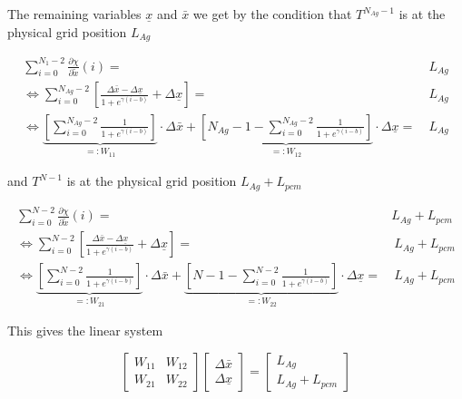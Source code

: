 \documentclass{scrartcl}[12pt, halfparskip]
\numberwithin{equation}{section}
\numberwithin{figure}{section}
\numberwithin{table}{section}
\begin{document}
The remaining variables $\underline{x}$ and $\bar{x}$ we get by the condition that $T^{N_{Ag}-1}$ is at the physical grid position $L_{Ag}$

\begin{subequations}
	\begin{align}
	\sum_{i=0}^{N_1 - 2} \frac{\partial \chi}{\partial \tilde{x}}(i) = \ & L_{Ag} \\
	\Leftrightarrow \sum_{i=0}^{N_{Ag} - 2} \left[ \frac{\Delta \bar{x} - \Delta \underline{x}}{1 + e^{\gamma(i - b)}} + \Delta \underline{x} \right] = \ & L_{Ag} \\
	\Leftrightarrow \underbrace{ \left[ \sum_{i=0}^{N_{Ag} - 2} \frac{1}{1 + e^{\gamma(i - b)}} \right] }_{=: W_{11}} \cdot \Delta \bar{x} + \underbrace{\left[ N_{Ag} - 1 - \sum_{i=0}^{N_{Ag} - 2} \frac{1}{1 + e^{\gamma(i - b)}} \right]}_{=: W_{12}} \cdot \Delta \underline{x} = \ & L_{Ag}
	\end{align}
\end{subequations}

and $T^{N-1}$ is at the physical grid position $L_{Ag}+L_{pcm}$

\begin{subequations}
	\begin{align}
	\sum_{i=0}^{N - 2} \frac{\partial \chi}{\partial \tilde{x}}(i) = \ & L_{Ag}+L_{pcm} \\
	\Leftrightarrow \sum_{i=0}^{N - 2} \left[ \frac{\Delta \bar{x} - \Delta \underline{x}}{1 + e^{\gamma(i - b)}} + \Delta \underline{x} \right] = & \ L_{Ag}+L_{pcm} \\
	\Leftrightarrow \underbrace{ \left[ \sum_{i=0}^{N - 2} \frac{1}{1 + e^{\gamma(i - b)}} \right] }_{=: W_{21}} \cdot \Delta \bar{x} + \underbrace{ \left[ N - 1 - \sum_{i=0}^{N - 2} \frac{1}{1 + e^{\gamma(i - b)}} \right] }_{=: W_{22}} \cdot \Delta \underline{x} = & \ L_{Ag}+L_{pcm}
	\end{align}
\end{subequations}

This gives the linear system

\begin{equation}
	\begin{bmatrix}
		W_{11} & W_{12} \\
		W_{21} & W_{22}
	\end{bmatrix}
	\begin{bmatrix}
		\Delta \bar{x} \\
		\Delta \underline{x}
	\end{bmatrix}
	= 
	\begin{bmatrix}
		L_{Ag} \\
		L_{Ag} + L_{pcm}
	\end{bmatrix}
\end{equation}
  
\end{document}
